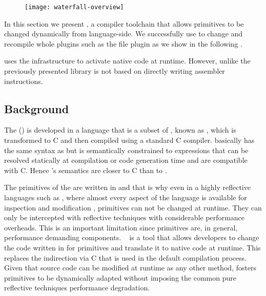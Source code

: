\begin{figure}[h]
	\centering
	\texttt{[image: waterfall-overview]}
\end{figure}

\noindent In this section we present \WF, a compiler toolchain that allows primitives to be changed dynamically from language-side.
We successfully use \WF to change and recompile whole \VM plugins such as the file plugin as we show in the following .

\WF uses the \B infrastructure to activate native code at runtime.
However, unlike the previously presented \FFI library \WF is not based on directly writing assembler instructions.


\subsection{Background}

The \PH \VM () is developed in a language that is a subset of \ST, known as \Slang, which is transformed to C and then compiled using a standard C compiler.  
\Slang basically has the same syntax as \ST but is semantically constrained to expressions that can be resolved statically at compilation or code generation time and are compatible with C.
Hence \Slang's semantics are closer to C than to \ST. 

The primitives of the \VM are written in \Slang and that is why even in a highly reflective languages such as \ST, where almost every aspect of the language is available for inspection and modification \cite{Denk10a}, primitives can not be changed at runtime.
They can only be intercepted with reflective techniques with considerable performance overheads.
This is an important limitation since primitives are, in general, performance demanding components.
\WF~\cite{Char13a} is a tool that allows developers to change the code written in \Slang for primitives and translate it to native code at runtime.
This replaces the indirection via C that is used in the default compilation process.
Given that \Slang source code can be modified at runtime as any other \ST method, \WF fosters primitives to be dynamically adapted without imposing the common pure reflective techniques performance degradation.

